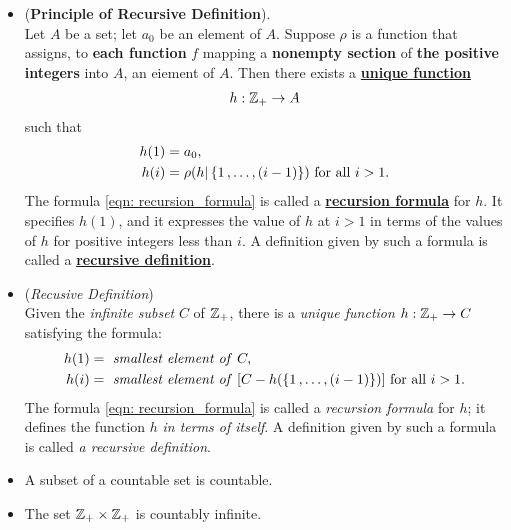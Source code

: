 \documentclass[11pt]{article}
\begin{document}
\begin{itemize}
\item \begin{theorem} (\textbf{Principle of Recursive Definition}).  \citep{munkres2000topology} \\
Let $A$ be a set; let $a_0$ be an element of $A$. Suppose $\rho$ is a function that assigns, to \textbf{each function} $f$ mapping a \textbf{nonempty section} of \textbf{the positive integers} into $A$, an eiement of $A$. Then there exists a \underline{\textbf{unique function}}
\begin{align*}
h: {\mathbb Z}_{+} \rightarrow A
\end{align*} such that
\begin{align}
h(1) &= a_0, \nonumber\\
h(i)  &=\rho(h | \left\{1 \,{,}\ldots{,}\, (i-1)\right\})\text{ for all }i > 1.  \label{eqn: recursion_formula}
\end{align}
The formula \eqref{eqn: recursion_formula} is called a \underline{\textbf{recursion formula}} for $h$. It specifies $h(1)$, and it
expresses the value of $h$ at $i > 1$ in terms of the values of $h$ for positive integers less than $i$. A definition given by such a formula is called a \underline{\textbf{recursive definition}}.
\end{theorem}

\item \begin{remark} (\emph{Recusive Definition})\\
Given the \emph{infinite subset} $C$ of ${\mathbb Z}_{+}$, there is a \emph{unique function} $h: {\mathbb Z}_{+} \rightarrow C$ satisfying the formula:
\begin{align}
h(1) &=\text{ \emph{smallest element of} }C, \nonumber\\
h(i)  &=\text{ \emph{smallest element of} }[C - h(\left\{1 \,{,}\ldots{,}\, (i-1)\right\})]\text{ for all }i > 1.  \label{eqn: recursion_formula}
\end{align}
The formula \eqref{eqn: recursion_formula} is called a \emph{recursion formula} for $h$; it defines the function $h$ \emph{in terms of itself}. A definition given by such a formula is called \emph{a recursive definition}.
\end{remark}

\item \begin{corollary}
A subset of a countable set is countable.
\end{corollary}

\item \begin{corollary}
The set ${\mathbb Z}_{+} \times {\mathbb Z}_{+}$ is countably infinite.
\end{corollary}


\end{itemize}
\end{document}
